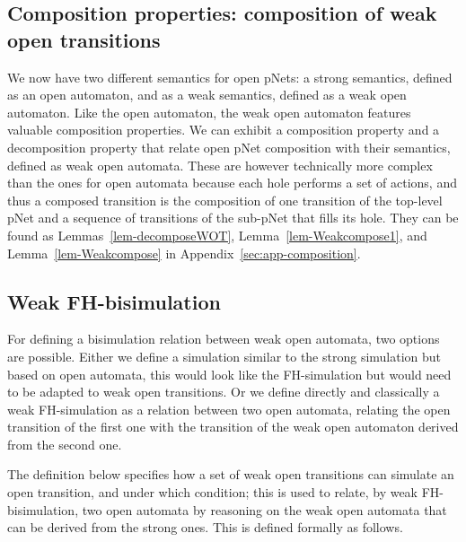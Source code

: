 \documentclass{elsarticle}
\begin{document}
\subsection{Composition properties: composition of weak open transitions}
We now have two different semantics for open pNets: a strong semantics, defined  as an open automaton, and as a weak semantics, defined as a weak open automaton. Like the open automaton, the weak open automaton features valuable composition properties. We can exhibit  a composition property and a decomposition property that relate open pNet composition with their semantics, defined as weak open automata. These are however technically more complex than the ones for open automata because each hole performs a set of actions, and thus a composed transition is the composition of one transition of the top-level pNet and a sequence of transitions of the sub-pNet that fills its hole. They can be found as Lemmas~\ref{lem-decomposeWOT}, Lemma~\ref{lem-Weakcompose1}, and Lemma~\ref{lem-Weakcompose} in Appendix~\ref{sec:app-composition}.



\subsection{Weak FH-bisimulation}
For defining a bisimulation relation between weak open automata, two options are possible. Either we define a simulation similar to the strong simulation but based on open automata, this would look like the FH-simulation but would need to be adapted to weak open transitions. Or we define directly and classically a weak FH-simulation as a relation between two open automata, relating the open transition of the first one with the transition of the weak open automaton derived from the second one. 

The definition below specifies how a set of weak open transitions can simulate an open transition, and under which condition; this is used to relate, by weak FH-bisimulation, two open automata by reasoning on the weak open automata that can be derived from the strong ones.
This is defined formally as follows.
\end{document}
